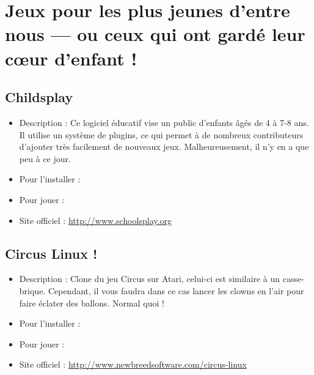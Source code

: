 \section{Jeux pour les plus jeunes d'entre nous --- ou ceux qui ont gardé leur cœur d'enfant !}
\subsection{Childsplay}
\begin{itemize}
\begingroup
{}
\item Description : Ce logiciel éducatif vise un public d'enfants âgés de 4 à 7-8 ans. Il utilise un système de plugins, ce qui permet à de nombreux contributeurs d'ajouter très facilement de nouveaux jeux. Malheureusement, il n'y en a que peu à ce jour.{\par}
\endgroup
\item Pour l'installer : 
\item Pour jouer : 
\item Site officiel : \url{http://www.schoolsplay.org}{\par}
\end{itemize}
\subsection{Circus Linux !}
\begin{itemize}
\begingroup
{}
\item Description : Clone du jeu Circus sur Atari, celui-ci est similaire à un casse-brique. Cependant, il vous faudra dans ce cas lancer les clowns en l'air pour faire éclater des ballons. Normal quoi !{\par}
\item Pour l'installer : 
\item Pour jouer : 
\item Site officiel : \url{http://www.newbreedsoftware.com/circus-linux}{\par}
\endgroup
\end{itemize}
\newpage
